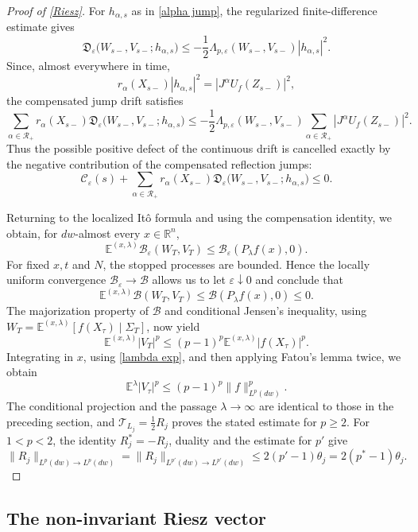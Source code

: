 \documentclass[11pt]{amsart}
\theoremstyle{definition}
\theoremstyle{remark}
\numberwithin{equation}{section}
\newcommand{\R}{\mathbb{R}}
\newcommand{\RR}{\mathcal{R}}
\begin{document}
\begin{proof}[Proof of \cref{Riesz}]
For $h_{\alpha,s}$ as in \eqref{alpha jump}, the regularized finite-difference estimate gives
\[
\mathfrak D_\varepsilon\bigl(W_{s-},V_{s-};h_{\alpha,s}\bigr)
\leq-\frac12\Lambda_{p,\varepsilon}(W_{s-},V_{s-})|h_{\alpha,s}|^2.
\]
Since, almost everywhere in time,
\[
r_\alpha(X_{s-})|h_{\alpha,s}|^2=|J^\alpha U_f(Z_{s-})|^2,
\]
the compensated jump drift satisfies
\[
\sum_{\alpha\in\RR_+}r_\alpha(X_{s-})
\mathfrak D_\varepsilon\bigl(W_{s-},V_{s-};h_{\alpha,s}\bigr)
\leq-\frac12\Lambda_{p,\varepsilon}(W_{s-},V_{s-})
\sum_{\alpha\in\RR_+}|J^\alpha U_f(Z_{s-})|^2.
\]
Thus the possible positive defect of the continuous drift is cancelled exactly
by the negative contribution of the compensated reflection jumps:
\[
\mathscr C_\varepsilon(s)
+\sum_{\alpha\in\RR_+}r_\alpha(X_{s-})
\mathfrak D_\varepsilon\bigl(W_{s-},V_{s-};h_{\alpha,s}\bigr)
\leq0.
\]

Returning to the localized It\^o formula and using the compensation
identity, we obtain, for $dw$-almost every $x\in\R^n$,
\[
\mathbb E^{(x,\lambda)}\mathcal B_\varepsilon(W_T,V_T)
\leq\mathcal B_\varepsilon(P_\lambda f(x),0).
\]
For fixed $x,t$ and $N$, the stopped processes are bounded. Hence the
locally uniform convergence
$\mathcal B_\varepsilon\to\mathcal B$ allows us to let
$\varepsilon\downarrow0$ and conclude that
\[
\mathbb E^{(x,\lambda)}\mathcal B(W_T,V_T)
\leq\mathcal B(P_\lambda f(x),0)\leq0.
\]
The majorization property of $\mathcal B$ and conditional Jensen's inequality, using $W_T=\mathbb E^{(x,\lambda)}[f(X_\tau)\mid\Sigma_T]$, now yield
\[
\mathbb E^{(x,\lambda)}|V_T|^p
\leq(p-1)^p\mathbb E^{(x,\lambda)}|f(X_\tau)|^p.
\]
Integrating in $x$, using \cref{lambda exp}, and then applying Fatou's lemma twice, we obtain
\begin{equation*}
\mathbb E^\lambda|V_\tau|^p
\leq(p-1)^p\|f\|_{L^p(dw)}^p.
\end{equation*}
The conditional projection and the passage $\lambda\to\infty$ are
identical to those in the preceding section, and
$\mathcal T_{L_j}=\frac12R_j$ proves the stated estimate for $p\geq2$. For $1<p<2$, the identity $R_j^*=-R_j$, duality and the estimate for $p'$ give
\[
\|R_j\|_{L^p(dw)\to L^p(dw)}
=\|R_j\|_{L^{p'}(dw)\to L^{p'}(dw)}
\leq2(p'-1)\theta_j
=2(p^*-1)\theta_j.
\]
\end{proof}

\subsection{The non-invariant Riesz vector}
\end{document}
